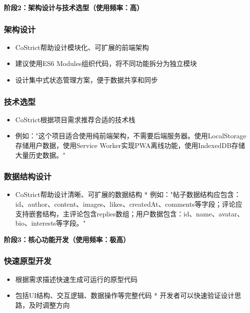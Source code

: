 ﻿\documentclass[12pt,a4paper]{article}
\begin{document}
\textbf{阶段2：架构设计与技术选型（使用频率：高）}

\subsubsection{架构设计}
\begin{itemize}
    \item CoStrict帮助设计模块化、可扩展的前端架构
    \item 建议使用ES6 Modules组织代码，将不同功能拆分为独立模块
    \item 设计集中式状态管理方案，便于数据共享和同步
\end{itemize}

\subsubsection{技术选型}
\begin{itemize}
    \item CoStrict根据项目需求推荐合适的技术栈
    \item 例如："这个项目适合使用纯前端架构，不需要后端服务器。使用LocalStorage存储用户数据，使用Service Worker实现PWA离线功能，使用IndexedDB存储大量历史数据。"
\end{itemize}

\subsubsection{数据结构设计}
\begin{itemize}
    \item CoStrict帮助设计清晰、可扩展的数据结构
    * 例如："帖子数据结构应包含：id、author、content、images、likes、createdAt、comments等字段；评论应支持嵌套结构，主评论包含replies数组；用户数据包含：id、name、avatar、bio、interests等字段。"
\end{itemize}

\textbf{阶段3：核心功能开发（使用频率：极高）}

\subsubsection{快速原型开发}
\begin{itemize}
    \item 根据需求描述快速生成可运行的原型代码
    \item 包括UI结构、交互逻辑、数据操作等完整代码
    * 开发者可以快速验证设计思路，及时调整方向
\end{itemize}
\end{document}
